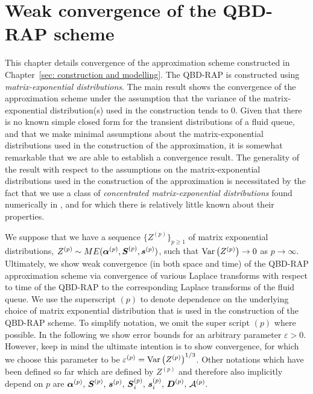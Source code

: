 \chapter{Weak convergence of the QBD-RAP scheme\label{sec: conv}}
This chapter details convergence of the approximation scheme constructed in Chapter~\ref{sec: construction and modelling}. The QBD-RAP is constructed using \emph{matrix-exponential distributions}. The main result shows the convergence of the approximation scheme under the assumption that the variance of the matrix-exponential distribution(s) used in the construction tends to 0. Given that there is no known simple closed form for the transient distributions of a fluid queue, and that we make minimal assumptions about the matrix-exponential distributions used in the construction of the approximation, it is somewhat remarkable that we are able to establish a convergence result. The generality of the result with respect to the assumptions on the matrix-exponential distributions used in the construction of the approximation is necessitated by the fact that we use a class of \emph{concentrated matrix-exponential distributions} found numerically in \citep{hhat2020}, and for which there is relatively little known about their properties.

We suppose that we have a sequence \(\{Z^{(p)}\}_{p\geq 1}\) of matrix exponential distributions, \(Z^{(p)}\sim ME(\boldsymbol\alpha^{(p)},\boldsymbol S^{(p)}, \boldsymbol s^{(p)})\), such that \(\mathrm{Var}\left(Z^{(p)}\right)\to 0 \) as \(p\to \infty\). Ultimately, we show weak convergence (in both space and time) of the QBD-RAP approximation scheme via convergence of various Laplace transforms with respect to time of the QBD-RAP to the corresponding Laplace transforms of the fluid queue. We use the superscript \((p)\) to denote dependence on the underlying choice of matrix exponential distribution that is used in the construction of the QBD-RAP scheme. To simplify notation, we omit the super script \((p)\) where possible. In the following we show error bounds for an arbitrary parameter \(\varepsilon>0\). However, keep in mind the ultimate intention is to show convergence, for which we choose this parameter to be \(\varepsilon^{(p)}=\mathrm{Var}\left(Z^{(p)}\right)^{1/3}\). Other notations which have been defined so far which are defined by \(Z^{(p)}\) and therefore also implicitly depend on \(p\) are \(\boldsymbol\alpha^{(p)},\,\boldsymbol S^{(p)},\,\boldsymbol s^{(p)},\, \boldsymbol S_i^{(p)},\, \boldsymbol s_i^{(p)},\, \boldsymbol D^{(p)},\,\mathcal A^{(p)}.\)

